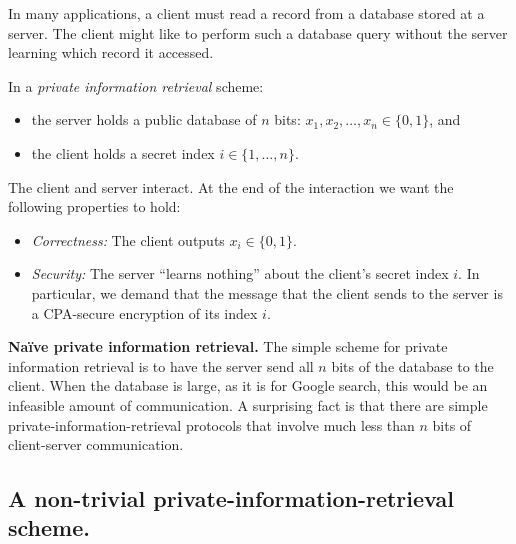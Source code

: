 \documentclass[
  letterpaper,
]{scrbook}
\providecommand{\tightlist}{%
  \setlength{\itemsep}{0pt}\setlength{\parskip}{0pt}}
\newcommand{\zo}{\{0,1\}}
\newcommand{\bin}{\zo}
\theoremstyle{definition}
\theoremstyle{plain}
\theoremstyle{plain}
\theoremstyle{remark}
\begin{document}
In many applications, a client must read a record from a database stored
at a server. The client might like to perform such a database query
without the server learning which record it accessed.


In a \emph{private information retrieval} scheme:

\begin{itemize}
\tightlist
\item
  the server holds a public database of \(n\) bits:
  \(x_1, x_2, \ldots, x_n \in \bin\), and
\item
  the client holds a secret index \(i \in \{1, \dots, n\}\).
\end{itemize}

The client and server interact. At the end of the interaction we want
the following properties to hold:

\begin{itemize}
\tightlist
\item
  \emph{Correctness:} The client outputs \(x_i \in \bin\).
\item
  \emph{Security:} The server ``learns nothing'' about the client's
  secret index \(i\). In particular, we demand that the message that the
  client sends to the server is a CPA-secure encryption of its index
  \(i\).
\end{itemize}

\textbf{Naïve private information retrieval.} The simple scheme for
private information retrieval is to have the server send all \(n\) bits
of the database to the client. When the database is large, as it is for
Google search, this would be an infeasible amount of communication. A
surprising fact is that there are simple private-information-retrieval
protocols that involve much less than \(n\) bits of client-server
communication.

\subsection{A non-trivial private-information-retrieval
scheme.}\label{a-non-trivial-private-information-retrieval-scheme.}
\end{document}
